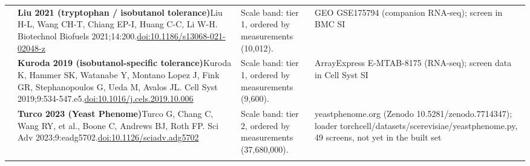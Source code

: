 \begin{landscape}
\begin{longtable}{@{}r@{\hspace{4pt}} L{86mm} L{92mm} L{62mm}@{}}
 & \textbf{Liu 2021 (tryptophan / isobutanol tolerance)}\newline Liu H-L, Wang CH-T, Chiang EP-I, Huang C-C, Li W-H. Biotechnol Biofuels 2021;14:200.\newline \href{https://doi.org/10.1186/s13068-021-02048-z}{doi:10.1186/\allowbreak s13068-021-02048-z} & Scale band: tier 1, ordered by measurements (10,012). & GEO GSE175794 (companion RNA-seq); screen in BMC SI \\
 & \textbf{Kuroda 2019 (isobutanol-specific tolerance)}\newline Kuroda K, Hammer SK, Watanabe Y, Montano Lopez J, Fink GR, Stephanopoulos G, Ueda M, Avalos JL. Cell Syst 2019;9:534-547.e5.\newline \href{https://doi.org/10.1016/j.cels.2019.10.006}{doi:10.1016/\allowbreak j.cels.2019.10.006} & Scale band: tier 1, ordered by measurements (9,600). & ArrayExpress E-MTAB-8175 (RNA-seq); screen data in Cell Syst SI \\
 & \textbf{Turco 2023 (Yeast Phenome)}\newline Turco G, Chang C, Wang RY, et al., Boone C, Andrews BJ, Roth FP. Sci Adv 2023;9:eadg5702.\newline \href{https://doi.org/10.1126/sciadv.adg5702}{doi:10.1126/\allowbreak sciadv.adg5702} & Scale band: tier 2, ordered by measurements (37,680,000). & yeastphenome.org (Zenodo 10.5281/\allowbreak zenodo.7714347); loader torchcell/\allowbreak datasets/\allowbreak scerevisiae/\allowbreak yeastphenome.py, 49 screens, not yet in the built set \\
\addlinespace[5pt]
\end{longtable}
\endgroup
\end{landscape}
